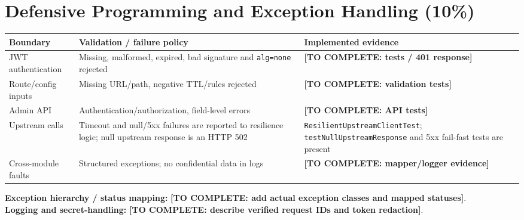 \documentclass[12pt,a4paper]{article}
\newcommand{\todo}[1]{\textcolor{red!70!black}{\textbf{[TO COMPLETE: #1]}}}
\begin{document}
\section{Defensive Programming and Exception Handling (10\%)}\label{sec:defensive}
\begin{longtable}{L{3.3cm} L{4.5cm} L{4.5cm}}\toprule
\textbf{Boundary} & \textbf{Validation / failure policy} & \textbf{Implemented evidence}\\\midrule\endhead
JWT authentication & Missing, malformed, expired, bad signature and \texttt{alg=none} rejected & \todo{tests / 401 response}\\
Route/config inputs & Missing URL/path, negative TTL/rules rejected & \todo{validation tests}\\
Admin API & Authentication/authorization, field-level errors & \todo{API tests}\\
Upstream calls & Timeout and null/5xx failures are reported to resilience logic; null upstream response is an HTTP 502 & \texttt{ResilientUpstreamClientTest}; \texttt{testNullUpstreamResponse} and 5xx fail-fast tests are present\\
Cross-module faults & Structured exceptions; no confidential data in logs & \todo{mapper/logger evidence}\\\bottomrule\end{longtable}
\textbf{Exception hierarchy / status mapping:} \todo{add actual exception classes and mapped statuses}.\\
\textbf{Logging and secret-handling:} \todo{describe verified request IDs and token redaction}.
\end{document}
